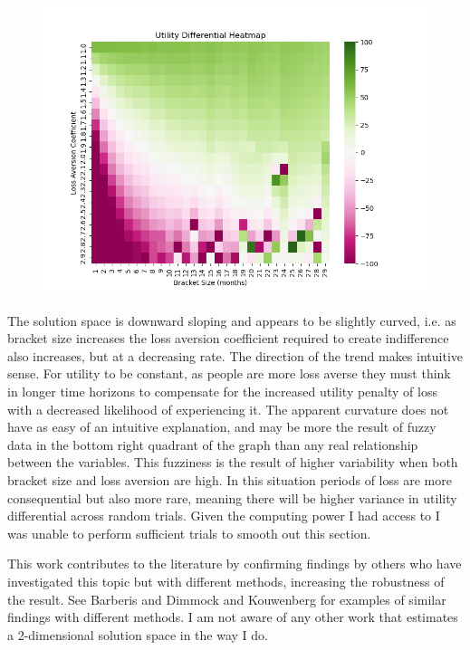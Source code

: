 \documentclass[10pt,twocolumn]{article}
\begin{document}
\begin{figure}[H]
    \centering
    \includegraphics[width=0.8\linewidth]{images/EPP2.png}
    \label{fig:enter-label}
\end{figure}

The solution space is downward sloping and appears to be slightly curved, i.e. as bracket size increases the loss aversion coefficient required to create indifference also increases, but at a decreasing rate. The direction of the trend makes intuitive sense. For utility to be constant, as people are more loss averse they must think in longer time horizons to compensate for the increased utility penalty of loss with a decreased likelihood of experiencing it. The apparent curvature does not have as easy of an intuitive explanation, and may be more the result of fuzzy data in the bottom right quadrant of the graph than any real relationship between the variables. This fuzziness is the result of higher variability when both bracket size and loss aversion are high. In this situation periods of loss are more consequential but also more rare, meaning there will be higher variance in utility differential across random trials. Given the computing power I had access to I was unable to perform sufficient trials to smooth out this section. 

This work contributes to the literature by confirming findings by others who have investigated this topic but with different methods, increasing the robustness of the result. See Barberis\cite{BarberisEPP} and Dimmock and Kouwenberg\cite{dimmock} for examples of similar findings with different methods. I am not aware of any other work that estimates a 2-dimensional solution space in the way I do. 
\end{document}
